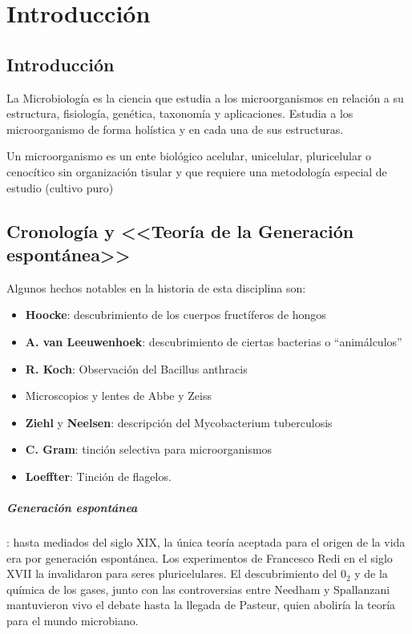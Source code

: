 \clearpage
\chapter{Introducción}
\label{chapter:Introduccion}
\section{Introducción}
\label{chap1:sec:introduccion}
La Microbiología es la ciencia que estudia a los microorganismos en relación a su estructura, fisiología, genética, taxonomía y aplicaciones. Estudia a los microorganismo de forma holística y en cada una de sus estructuras.

Un microorganismo es un ente biológico acelular, unicelular, pluricelular o cenocítico sin organización tisular y que requiere una metodología especial de estudio (cultivo puro)
\section{Cronología y <<Teoría de la Generación espontánea>>}
\label{chap1:sec:cronologia}
Algunos hechos notables en la historia de esta disciplina son:
\begin{itemize}[itemsep=0pt,parsep=0pt,topsep=0pt,partopsep=0pt]
	\item \textbf{Hoocke}: descubrimiento de los cuerpos fructíferos de hongos
	\item \textbf{A. van Leeuwenhoek}: descubrimiento de ciertas bacterias o “animálculos”
	\item \textbf{R. Koch}: Observación del Bacillus anthracis
	\item Microscopios y lentes de Abbe y Zeiss
	\item \textbf{Ziehl} y \textbf{Neelsen}: descripción del Mycobacterium tuberculosis
	\item \textbf{C. Gram}: tinción selectiva para microorganismos
	\item \textbf{Loeffter}: Tinción de flagelos.
\end{itemize}

\paragraph{Generación espontánea}: hasta mediados del siglo XIX, la única teoría aceptada para el origen de la vida era por generación espontánea. Los experimentos de Francesco Redi en el siglo XVII la invalidaron para seres pluricelulares. El descubrimiento del $0_2$ y de la química de los gases, junto con las controversias entre Needham y Spallanzani mantuvieron vivo el debate hasta la llegada de Pasteur, quien aboliría la teoría para el mundo microbiano.  

